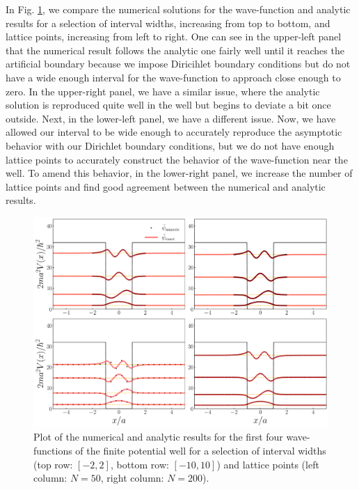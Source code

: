 In Fig. \ref{fig:finite-well-wfs}, we compare the numerical solutions for the wave-function and analytic results for a selection of interval widths, increasing from top to bottom, and lattice points, increasing from left to right.
One can see in the upper-left panel that the numerical result follows the analytic one fairly well until it reaches the artificial boundary because we impose Diricihlet boundary conditions but do not have a wide enough interval for the wave-function to approach close enough to zero.
In the upper-right panel, we have a similar issue, where the analytic solution is reproduced quite well in the well but begins to deviate a bit once outside.
Next, in the lower-left panel, we have a different issue.
Now, we have allowed our interval to be wide enough to accurately reproduce the asymptotic behavior with our Dirichlet boundary conditions, but we do not have enough lattice points to accurately construct the behavior of the wave-function near the well.
To amend this behavior, in the lower-right panel, we increase the number of lattice points and find good agreement between the numerical and analytic results.

\begin{figure}[h!tb]
    \centering
    \includegraphics[width=\linewidth]{finite_well_wfs.pdf}
    \caption{Plot of the numerical and analytic results for the first four wave-functions of the finite potential well for a selection of interval widths (top row: $[-2,2]$, bottom row: $[-10,10]$) and lattice points (left column: $N = 50$, right column: $N = 200$).}
    \label{fig:finite-well-wfs}
\end{figure}

